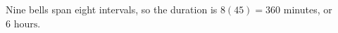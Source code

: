 Nine bells span eight intervals, so the duration is $8(45)=360$ minutes, or $\boxed6\text{ hours}$.
